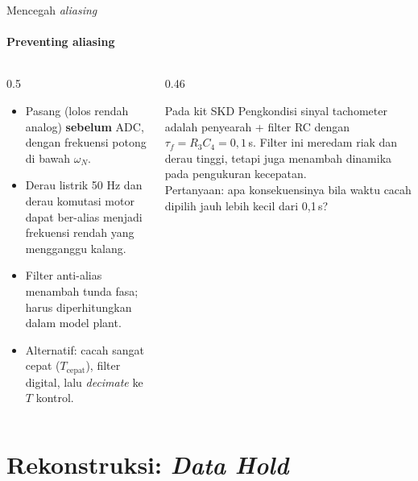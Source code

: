 \documentclass[aspectratio=169,10pt]{beamer}
\begin{document}
\begin{frame}{Mencegah \textit{aliasing}}
	\framesubtitle{Preventing aliasing}
	\begin{columns}[T]
		\begin{column}{0.5\textwidth}
			\begin{itemize}
				\item Pasang  (lolos rendah analog) \textbf{sebelum} ADC, dengan frekuensi potong di bawah $\omega_N$.
				\item Derau listrik 50 Hz dan derau komutasi motor dapat ber-alias menjadi frekuensi rendah yang mengganggu kalang.
				\item Filter anti-alias menambah tunda fasa; harus diperhitungkan dalam model plant.
				\item Alternatif: cacah sangat cepat ($T_{\text{cepat}}$), filter digital, lalu \textit{decimate} ke $T$ kontrol.
			\end{itemize}
		\end{column}
		\begin{column}{0.46\textwidth}
			\begin{exampleblock}{Pada kit SKD}
				\small
				Pengkondisi sinyal tachometer adalah penyearah + filter RC dengan $\tau_f = R_3C_4 = 0{,}1$\,s. Filter ini meredam riak dan derau tinggi, tetapi juga \alert{menambah dinamika} pada pengukuran kecepatan.\\[3pt]
				Pertanyaan: apa konsekuensinya bila waktu cacah dipilih jauh lebih kecil dari 0,1\,s?
			\end{exampleblock}
		\end{column}
	\end{columns}
\end{frame}

\section{Rekonstruksi: \textit{Data Hold}\texorpdfstring{\\[4pt]{\Large{}}}{ / Reconstruction: Data Hold}}
\end{document}
